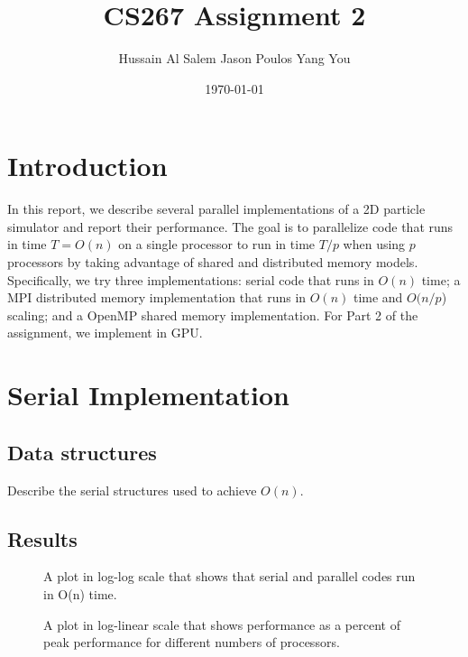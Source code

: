 \documentclass[12pt]{article}
\begin{document}
\title{CS267 Assignment 2}
\date{\today}
\author{Hussain Al Salem \hspace{5mm} Jason Poulos \hspace{5mm} Yang You \vspace{10mm}}
\maketitle

\section{Introduction}

In this report, we describe several parallel implementations of a 2D particle simulator and report their performance. The goal is to parallelize code that runs in time $T = O(n)$ on a single processor to run in time $T/p$ when using $p$ processors by taking advantage of shared and distributed memory models. Specifically, we try three implementations: serial code that runs in $O(n)$ time; a MPI distributed memory implementation that runs in $O(n)$ time and $O(n/p$) scaling; and a OpenMP shared memory implementation. For Part 2 of the assignment, we implement in GPU. 

\section{Serial Implementation}

\subsection{Data structures}
Describe the serial structures used to achieve $O(n)$. 

\subsection{Results}

\begin{figure}
  \caption{A plot in log-log scale that shows that serial and parallel codes run in O(n) time.}
  \label{fig:serial-on}
\end{figure}

\begin{figure}
  \caption{A plot in log-linear scale that shows performance as a percent of peak performance for different numbers of processors.}
  \label{fig:serial-peak}
\end{figure}
\end{document}

